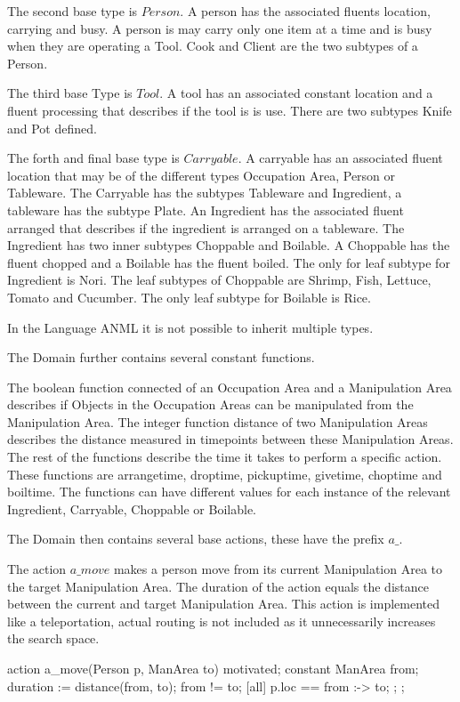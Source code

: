 The second base type is $Person$.
A person has the associated fluents location, carrying and busy.
A person is may carry only one item at a time and is busy when they are operating a Tool.
Cook and Client are the two subtypes of a Person.

The third base Type is $Tool$. A tool has an associated constant location and a fluent processing that describes if the tool is is use.
There are two subtypes Knife and Pot defined.

The forth and final base type is $Carryable$.
A carryable has an associated fluent location that may be of the different types Occupation Area, Person or Tableware.
The Carryable has the subtypes Tableware and Ingredient, a tableware has the subtype Plate.
An Ingredient has the associated fluent arranged that describes if the ingredient is arranged on a tableware.
The Ingredient has two inner  subtypes Choppable and Boilable.
A Choppable has the fluent chopped and a Boilable has the fluent boiled.
The only for leaf subtype for Ingredient is Nori.
The leaf subtypes of Choppable are Shrimp, Fish, Lettuce, Tomato and Cucumber.
The only leaf subtype for Boilable is Rice.

In the Language ANML it is not possible to inherit multiple types.

The Domain further contains several constant functions.

The boolean function connected of an Occupation Area and a Manipulation Area describes if Objects in the Occupation Areas can be manipulated from the Manipulation Area.
The integer function distance of two Manipulation Areas describes the distance measured in timepoints between these Manipulation Areas.
The rest of the functions describe the time it takes to perform a specific action.
These functions are arrangetime, droptime, pickuptime, givetime, choptime and boiltime.
The functions can have different values for each instance of the relevant Ingredient, Carryable, Choppable or Boilable.

The Domain then contains several base actions, these have the prefix $a\_$.

The action $a\_move$ makes a person move from its current Manipulation Area to the target Manipulation Area.
The duration of the action equals the distance between the current and target Manipulation Area.
This action is implemented like a teleportation, actual routing is not included as it unnecessarily increases the search space.

\begin{anmlcode}
action a_move(Person p, ManArea to) {
  motivated;
  constant ManArea from;
  duration := distance(from, to);
  from != to;
  [all] {
    p.loc == from :-> to;
  };
};
\end{anmlcode}

